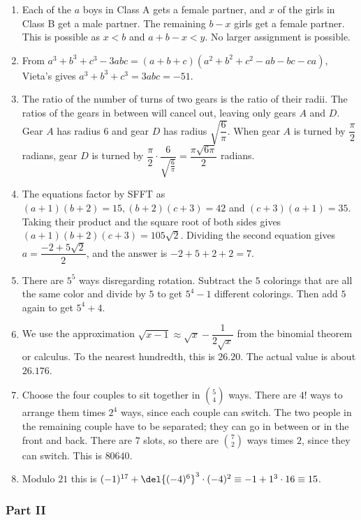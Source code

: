 \documentclass[10pt,paper=letter]{scrartcl}
\begin{document}
\begin{enumerate}
  \item Each of the $a$ boys in Class A gets a female partner, and $x$ of the girls in Class B get a male partner. The remaining $b-x$ girls get a female partner. This is possible as $x < b$ and $a+b-x < y$. No larger assignment is possible.
  \item From $a^3 + b^3 + c^3 - 3abc = (a+b+c)(a^2 +b^2 +c^2 -ab -bc -ca)$, Vieta's gives $a^3 + b^3 + c^3 = 3abc = -51$.
  \item The ratio of the number of turns of two gears is the ratio of their radii. The ratios of the gears in between will cancel out, leaving only gears $A$ and $D$. Gear $A$ has radius $6$ and gear $D$ has radius $\sqrt{\dfrac6{\pi}}$. When gear $A$ is turned by $\dfrac{\pi}{2}$ radians, gear $D$ is turned by $\dfrac{\pi}2 \cdot \dfrac6{\sqrt{\frac6{\pi}}} = \dfrac{\pi\sqrt{6\pi}}2$ radians.
  \item The equations factor by SFFT as $(a+1)(b+2) = 15, (b+2)(c+3) = 42$ and $(c+3)(a+1) = 35$. Taking their product and the square root of both sides gives $(a+1)(b+2)(c+3) = 105\sqrt2$. Dividing the second equation gives $a = \dfrac{-2 + 5\sqrt2}2$, and the answer is $-2 + 5 + 2 + 2 = 7$.
  \item There are $5^5$ ways disregarding rotation. Subtract the $5$ colorings that are all the same color and divide by $5$ to get $5^4 - 1$ different colorings. Then add $5$ again to get $5^4 + 4$.
  \item We use the approximation $\sqrt{x-1} \approx \sqrt{x} - \dfrac1{2\sqrt{x}}$ from the binomial theorem or calculus. To the nearest hundredth, this is $26.20$. The actual value is about $26.176$.
  \item Choose the four couples to sit together in $\binom54$ ways. There are $4!$ ways to arrange them times $2^4$ ways, since each couple can switch. The two people in the remaining couple have to be separated; they can go in between or in the front and back. There are $7$ slots, so there are $\binom72$ ways times $2$, since they can switch. This is $80640$.
  \item Modulo $21$ this is $(-1)^{17} + \del{(-4)^6}^3\cdot(-4)^2 \equiv -1 + 1^3 \cdot 16 \equiv 15$.
\end{enumerate}

\subsubsection*{Part II}
\end{document}
